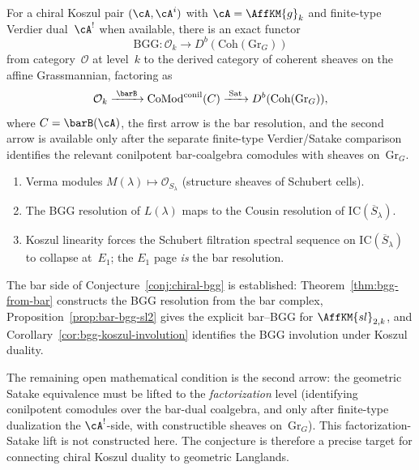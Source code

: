 \begin{conjecture}
\label{conj:chiral-bgg}
For a chiral Koszul pair $(\cA,\cA^i)$ with
$\cA = \AffKM{g}_k$ and finite-type Verdier dual~$\cA^!$ when
available,
there is an exact functor
\[
 \mathrm{BGG} \colon \mathcal{O}_k
 \longrightarrow D^b(\mathrm{Coh}(\mathrm{Gr}_G))
\]
from category~$\mathcal{O}$ at level~$k$ to the derived category
of coherent sheaves on the affine Grassmannian, factoring as
\[
 \mathcal{O}_k
 \xrightarrow{\;\barB\;}
 \mathrm{CoMod}^{\mathrm{conil}}(C)
 \xrightarrow{\;\mathrm{Sat}\;}
 D^b(\mathrm{Coh}(\mathrm{Gr}_G)),
\]
where $C=\barB(\cA)$, the first arrow is the bar resolution, and the
second arrow is available only after the separate finite-type
Verdier/Satake comparison identifies the relevant conilpotent
bar-coalgebra comodules with sheaves on~$\mathrm{Gr}_G$.
\begin{enumerate}[label=\textup{(\roman*)},leftmargin=2.5em]
\item Verma modules $M(\lambda) \mapsto \mathcal{O}_{S_\lambda}$
 \textup{(}structure sheaves of Schubert cells\textup{)}.
\item The BGG resolution of $L(\lambda)$ maps to the Cousin
 resolution of $\mathrm{IC}(\overline{S}_\lambda)$.
\item Koszul linearity forces the Schubert filtration spectral
 sequence on $\mathrm{IC}(\overline{S}_\lambda)$ to collapse
 at~$E_1$; the $E_1$ page \emph{is} the bar resolution.
\end{enumerate}
\end{conjecture}

\begin{remark}
\label{rem:chiral-bgg-proof-obligation}
The bar side of Conjecture~\ref{conj:chiral-bgg} is established:
Theorem~\ref{thm:bgg-from-bar} constructs the BGG resolution from
the bar complex, Proposition~\ref{prop:bar-bgg-sl2} gives the
explicit bar--BGG for $\AffKM{sl}_{2,k}$, and
Corollary~\ref{cor:bgg-koszul-involution} identifies the BGG
involution under Koszul duality.

The remaining open mathematical condition is the second arrow: the geometric
Satake equivalence must be lifted to the
\emph{factorization} level (identifying conilpotent comodules over the
bar-dual coalgebra, and only after finite-type dualization the
$\cA^!$-side, with constructible sheaves on~$\mathrm{Gr}_G$). This
factorization-Satake lift is not constructed here. The conjecture is
therefore a precise target for connecting chiral Koszul duality to
geometric Langlands.
\end{remark}

